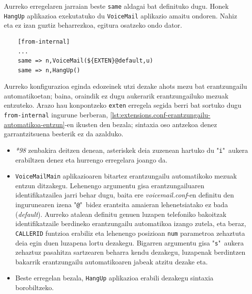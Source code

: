 Aurreko erregelaren jarraian beste \texttt{same} aldagai bat definituko dugu. Honek \texttt{HangUp} aplikazioa exekutatuko du \texttt{VoiceMail} aplikazio amaitu ondoren. Nahiz eta ez izan guztiz beharrezkoa, egitura osatzeko ondo dator.

\begin{listing}
    \begin{verbatim}
    [from-internal]
    ...
    same => n,VoiceMail(${EXTEN}@default,u)
    same => n,HangUp()
    \end{verbatim}
    \caption{Erantzungailu automatikoaren konfigurazioa extensions.conf konfigurazio fitxategian}
    \label{lst:extensions.conf-erantzungailu-automatikoa}
\end{listing}

Aurreko konfigurazioa eginda edozeinek utzi dezake ahots mezu bat erantzungailu automatikoetan; baina, oraindik ez dugu aukerarik erantzungailuko mezuak entzuteko. Arazo hau konpontzeko \texttt{exten} erregela segida berri bat sortuko dugu \texttt{from-internal} ingurune berberan, \autoref{lst:extensions.conf-erantzungailu-automatikoa-entzun}-en ikusten den bezala; sintaxia oso antzekoa denez garrantzitsuena besterik ez da azalduko.
\begin{itemize}
    \item \textit{*98} zenbakira deitzen denean, asteriskek deia zuzenean hartuko du "\texttt{i}"\ aukera erabiltzen denez eta hurrengo erregelara joango da.
    \item \texttt{VoiceMailMain} aplikazioaren bitartez erantzungailu automatikoko mezuak entzun ditzakegu. Lehenengo argumentu gisa erantzungailuaren identifikatzailea jarri behar dugu, baita ere \textit{voicemail.conf}-en definitu den ingurunearen izena "\texttt{@}"\ bidez erantsita amaieran lehenetsiatako ez bada (\textit{default}). Aurreko atalean definitu genuen luzapen telefoniko bakoitzak identifikatzaile berdineko erantzungailu automatikoa izango zutela, eta beraz, \texttt{CALLERID} funtzioa erabiliz eta  lehenengo posizioan \texttt{num} parametroa zehaztuta deia egin duen luzapena lortu dezakegu. Bigarren argumentu gisa "\texttt{s}"\ aukera zehaztuz pasahitza sartzearen beharra kendu dezakegu, luzapenak berdintzen bakarrik erantzungailu automatikoaren jabeak atzitu dezake eta.
    \item Beste erregelan bezala, \texttt{HangUp} aplikazioa erabili dezakegu sintaxia borobiltzeko.
\end{itemize}

